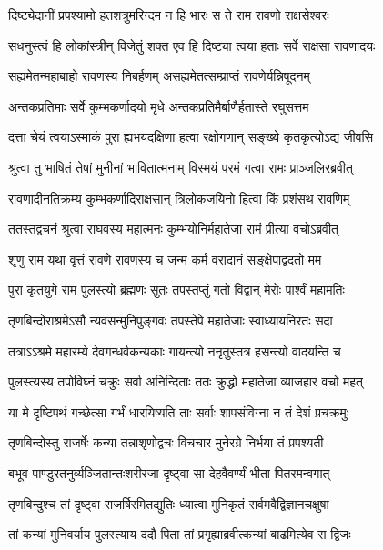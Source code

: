 \twolineshloka
{दिष्ट्येदानीं प्रपश्यामो हतशत्रुमरिन्दम}
{न हि भारः स ते राम रावणो राक्षसेश्वरः} %

\twolineshloka
{सधनुस्त्वं हि लोकांस्त्रीन् विजेतुं शक्त एव हि}
{दिष्ट्या त्वया हताः सर्वे राक्षसा रावणादयः} %

\twolineshloka
{सह्यमेतन्महाबाहो रावणस्य निबर्हणम्}
{असह्यमेतत्सम्प्राप्तं रावणेर्यन्निषूदनम्} %

\twolineshloka
{अन्तकप्रतिमाः सर्वे कुम्भकर्णादयो मृधे}
{अन्तकप्रतिमैर्बाणैर्हतास्ते रघुसत्तम} %

\twolineshloka
{दत्ता चेयं त्वयाऽस्माकं पुरा ह्यभयदक्षिणा}
{हत्वा रक्षोगणान् सङ्ख्ये कृतकृत्योऽद्य जीवसि} %

\twolineshloka
{श्रुत्वा तु भाषितं तेषां मुनीनां भावितात्मनाम्}
{विस्मयं परमं गत्वा रामः प्राञ्जलिरब्रवीत्} %

\twolineshloka
{रावणादीनतिक्रम्य कुम्भकर्णादिराक्षसान्}
{त्रिलोकजयिनो हित्वा किं प्रशंसथ रावणिम्} %

\twolineshloka
{ततस्तद्वचनं श्रुत्वा राघवस्य महात्मनः}
{कुम्भयोनिर्महातेजा रामं प्रीत्या वचोऽब्रवीत्} %

\twolineshloka
{शृणु राम यथा वृत्तं रावणे रावणस्य च}
{जन्म कर्म वरादानं सङ्क्षेपाद्वदतो मम} %

\twolineshloka
{पुरा कृतयुगे राम पुलस्त्यो ब्रह्मणः सुतः}
{तपस्तप्तुं गतो विद्वान् मेरोः पार्श्वं महामतिः} %

\twolineshloka
{तृणबिन्दोराश्रमेऽसौ न्यवसन्मुनिपुङ्गवः}
{तपस्तेपे महातेजाः स्वाध्यायनिरतः सदा} %

\twolineshloka
{तत्राऽऽश्रमे महारम्ये देवगन्धर्वकन्यकाः}
{गायन्त्यो ननृतुस्तत्र हसन्त्यो वादयन्ति च} %

\twolineshloka
{पुलस्त्यस्य तपोविघ्नं चक्रुः सर्वा अनिन्दिताः}
{ततः क्रुद्धो महातेजा व्याजहार वचो महत्} %

\twolineshloka
{या मे दृष्टिपथं गच्छेत्सा गर्भं धारयिष्यति}
{ताः सर्वाः शापसंविग्ना न तं देशं प्रचक्रमुः} %

\twolineshloka
{तृणबिन्दोस्तु राजर्षेः कन्या तन्नाशृणोद्वचः}
{विचचार मुनेरग्रे निर्भया तं प्रपश्यती} %

\twolineshloka
{बभूव पाण्डुरतनुर्व्यञ्जितान्तःशरीरजा}
{दृष्ट्वा सा देहवैवर्ण्यं भीता पितरमन्वगात्} %

\twolineshloka
{तृणबिन्दुश्च तां दृष्ट्वा राजर्षिरमितद्युतिः}
{ध्यात्वा मुनिकृतं सर्वमवैद्विज्ञानचक्षुषा} %

\twolineshloka
{तां कन्यां मुनिवर्याय पुलस्त्याय ददौ पिता}
{तां प्रगृह्याब्रवीत्कन्यां बाढमित्येव स द्विजः} %

